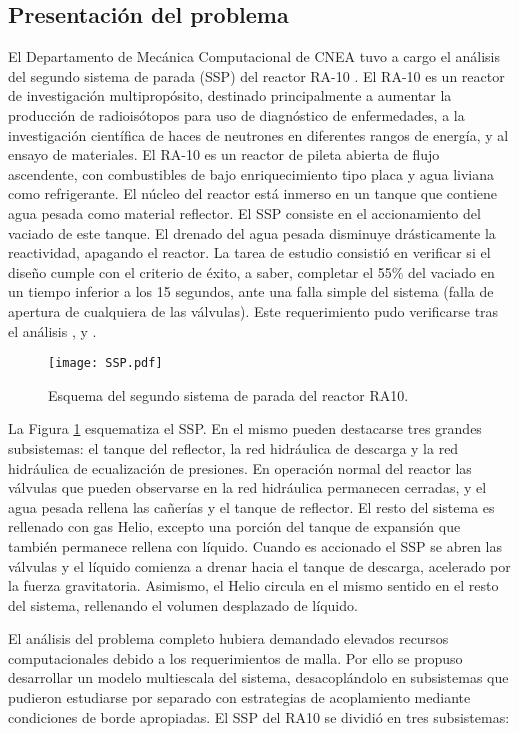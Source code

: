 \subsection*{Presentación del problema}
El Departamento de Mecánica Computacional de CNEA tuvo a cargo el análisis del segundo sistema de parada (SSP) del reactor RA-10 \cite{ra10}.
El RA-10 es un reactor de investigación multipropósito, destinado principalmente a aumentar la producción de radioisótopos para uso de diagnóstico de enfermedades,
a la investigación científica de haces de neutrones en diferentes rangos de energía,
y al ensayo de materiales.
El RA-10 es un reactor de pileta abierta de flujo ascendente, con combustibles de bajo enriquecimiento tipo placa y agua liviana como refrigerante.
El núcleo del reactor está inmerso en un tanque que contiene agua pesada como material reflector.
El SSP consiste en el accionamiento del vaciado de este tanque.
El drenado del agua pesada disminuye drásticamente la reactividad, apagando el reactor.
La tarea de estudio consistió en verificar si el diseño cumple con el criterio de éxito,
a saber, completar el 55\% del vaciado en un tiempo inferior a los 15 segundos,
ante una falla simple del sistema (falla de apertura de cualquiera de las válvulas).
Este requerimiento pudo verificarse tras el análisis \cite{cnea-informe-primero}, \cite{cnea-informe-mockup} y \cite{cnea-informe-ra10}.

\begin{figure}[ht]
\centering{}\texttt{[image: SSP.pdf]}
\caption{Esquema del segundo sistema de parada del reactor RA10.} \label{fig:SSP} 
\end{figure}

La Figura \ref{fig:SSP} esquematiza el SSP. 
En el mismo pueden destacarse tres grandes subsistemas: el tanque del reflector, la red hidráulica de descarga y
la red hidráulica de ecualización de presiones. 
En operación normal del reactor las
válvulas que pueden observarse en la red hidráulica permanecen cerradas, y el agua pesada rellena las cañerías y el tanque de reflector. 
El resto del sistema es rellenado con gas Helio, excepto una porción del tanque de expansión que también permanece rellena con líquido. 
Cuando es accionado el SSP se abren las válvulas y el líquido comienza a drenar hacia el tanque de descarga, acelerado por la fuerza gravitatoria. 
Asimismo, el Helio circula en el mismo sentido en el resto del sistema, rellenando el volumen desplazado de líquido.

El análisis del problema completo hubiera demandado elevados recursos computacionales debido a los requerimientos de malla.
Por ello se propuso desarrollar un modelo multiescala del sistema,
desacoplándolo en subsistemas que pudieron estudiarse por separado con estrategias de acoplamiento mediante condiciones de borde apropiadas.
El SSP del RA10 se dividió en tres subsistemas:

